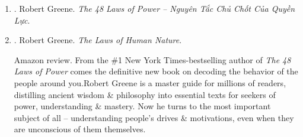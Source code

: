 \documentclass{article}
\begin{document}
\begin{enumerate}
\begin{quotation}
		{\it``Impatience, on the other hand, only makes you look weak. It is a principal impediment to power.''}
	\end{quotation}
	{\sf Editorial reviews.}
	\begin{itemize}
		\item ``{\sc Machiavelli} has a new rival. \& {\sc Sun Tzu} had better watch his back. {\sc Green} $\ldots$ has put together a checklist of ambitious behavior. Just reading the table of contents is enough to stir a little corner-office lust.'' -- {\it New York} magazine
		\item ``Beguiling $\ldots$ literate $\ldots$ fascinating. A wry primer for people who desperately want to be on top.'' -- {\it People} magazine
		\item ``An heir to {\sc Machiavelli}'s {\it Prince} $\ldots$ gentler souls will find this book frightening, those whose moral compass is oriented solely to power will have a perfect {\it vade mecum}.'' -- {\it Publishers Weekly}
		\item ``Satisfyingly dense $\ldots$ literary, with fantastic examples of genius power-game players. It's {\it The Rules} meets {\it In Pursuit of Wow!} with a degree in comparative literature.'' -- {\it Allure}
	\end{itemize}

	\item \cite{Greene_laws_power_VN}. {\sc Robert Greene}. {\it The 48 Laws of Power -- Nguyên Tắc Chủ Chốt Của Quyền Lực}.\hfill{\sf[done]}

	\item \cite{Greene_laws_human_nature}. {\sc Robert Greene}. {\it The Laws of Human Nature}. {}

	{\sf Amazon review.} From the \#1 New York Times-bestselling author of {\it The 48 Laws of Power} comes the definitive new book on decoding the behavior of the people around you.{\sc Robert Greene} is a master guide for millions of readers, distilling ancient wisdom \& philosophy into essential texts for seekers of power, understanding \& mastery. Now he turns to the most important subject of all -- understanding people's drives \& motivations, even when they are unconscious of them themselves.


\end{enumerate}
\end{document}
